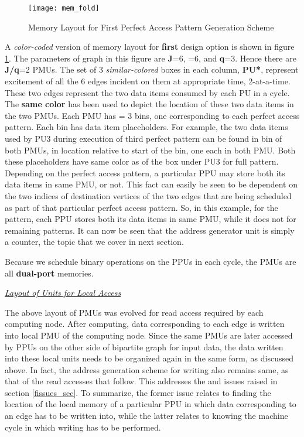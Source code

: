 \documentclass[12pt]{article}
\begin{document}
\begin{figure}[h]
\begin{center}
\texttt{[image: mem\_fold]}
\end{center}
\caption{Memory Layout for First Perfect Access Pattern Generation Scheme}
\label{fold_mem}
\end{figure}

A \textit{color-coded} version of memory layout
for \textbf{first} design option is shown in figure \ref{fold_mem}.
The parameters of graph in this figure are \textbf{J}=6,
=6, and \textbf{q}=3. Hence there are \textbf{J/q}=2
PMUs. The set of 3 \textit{similar-colored} boxes in
each column, \textbf{PU*}, represent excitement of all the 6 edges incident
on them at appropriate time, 2-at-a-time. These two edges represent the two
data items consumed by each PU in a cycle. The \textbf{same color} has been
used to depict the location of these two data items in the two
PMUs. Each PMU has = 3 bins, one
corresponding to each perfect access pattern. Each bin has  data item placeholders. For example, the two data items used
by PU3 during execution of third perfect pattern can be found in 
bin of both PMUs, in  location relative to start
of the bin, one each in both PMU. Both these placeholders have
same color as of the box under PU3 for  full pattern. Depending on
the perfect access pattern, a particular PPU may store both its
data items in same PMU, or not. This fact can easily be seen to be
dependent on the two indices of destination vertices of the two edges that
are being scheduled as part of that particular perfect access pattern. So,
in this example, for the  pattern, each PPU stores both
its data items in same PMU, while it does not for remaining
patterns. It can now be seen that the address generator unit is simply a
counter, the topic that we cover in next section.

Because we schedule binary operations on the PPUs in each
cycle, the PMUs are all \textbf{dual-port} memories.

\noindent \uline{\textit{Layout of Units for Local Access}}

The above layout of PMUs was evolved for read access required by
each computing node. After computing, data corresponding to each edge is
written into local PMU of the computing node. Since the same
PMUs are later accessed by PPUs on the other side of bipartite
graph for input data, the data written into these local units needs to be
organized again in the same form, as discussed above. In fact, the address
generation scheme for writing also remains same, as that of the read
accesses that follow. This addresses the  and  issues
raised in section \ref{fissues_sec}. To summarize, the former
issue relates to finding the location of the local memory of a
particular PPU in which data corresponding to an edge has to be written
into, while the latter relates to knowing the machine cycle in which
writing has to be performed.
\end{document}
